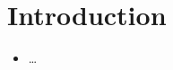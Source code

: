 \chapter{Introduction}
\begin{notes}
    \begin{itemize}
        \item \ldots
    \end{itemize}
\end{notes}
